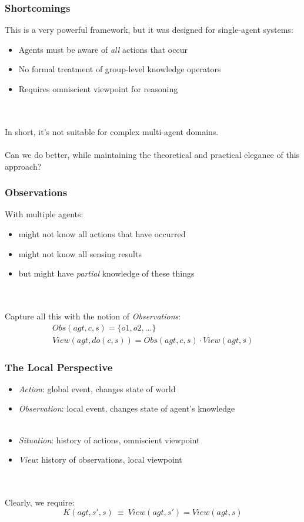 \documentclass{beamer}
\begin{document}
\begin{frame}
\frametitle{Shortcomings}
This is a very powerful framework, but it was designed for single-agent systems:
\begin{itemize}
 \item Agents must be aware of \emph{all} actions that occur
 \item No formal treatment of group-level knowledge operators
 \item Requires omniscient viewpoint for reasoning
\end{itemize}
\ \\
\ \\
In short, it's not suitable for complex multi-agent domains.
\ \\
\ \\
Can we do better, while maintaining the theoretical and practical elegance
of this approach?
\end{frame}

\begin{frame}
\frametitle{Observations}

With multiple agents:
\begin{itemize}
\item might not know all actions that have occurred
\item might not know all sensing results
\item but might have \emph{partial} knowledge of these things
\end{itemize}
\ \\
\ \\
\pause
Capture all this with the notion of \emph{Observations}:
\begin{gather*}
  Obs(agt,c,s) = \{o1,o2,...\} \\
  View(agt,do(c,s)) = Obs(agt,c,s) \cdot View(agt,s)
\end{gather*}
\end{frame}

\begin{frame}
\frametitle{The Local Perspective}
\begin{itemize}
\item \emph{Action}: global event, changes state of world
\item \emph{Observation}: local event, changes state of agent's knowledge\\
\ \\
\item \emph{Situation}: history of actions, omniscient viewpoint
\item \emph{View}: history of observations, local viewpoint
\end{itemize}
\ \\
\ \\
Clearly, we require:
\begin{equation*}
K(agt,s',s)\ \equiv\ View(agt,s') = View(agt,s)
\end{equation*}
\end{frame}
\end{document}
